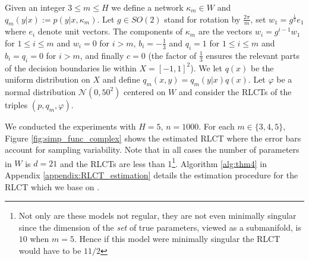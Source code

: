 \documentclass{article} %
\begin{document}
%


Given an integer $3 \le m \le H$ we define a network $\kappa_m \in W$ and $q_m(y|x) := p(y|x, \kappa_m)$. Let $g \in SO(2)$ stand for rotation by $\frac{2\pi}{m}$, set $w_1 = g^{\tfrac{1}{2}} e_1$ where $e_i$ denote unit vectors. The components of $\kappa_m$ are the vectors $w_i = g^{i-1} w_1$ for $1 \le i \le m$ and $w_i = 0$ for $i > m$, $b_i = - \tfrac{1}{3}$ and $q_i = 1$ for $1 \le i \le m$ and $b_i = q_i = 0$ for $i > m$, and finally $c = 0$ (the factor of $\tfrac{1}{3}$ ensures the relevant parts of the decision boundaries lie within $X = [-1,1]^2$). We let $q(x)$ be the uniform distribution on $X$ and define $q_m(x,y) = q_m(y|x) q(x)$. Let $\varphi$ be a normal distribution $\mathcal{N}(0,50^2)$ centered on $W$ and consider the RLCTs of the triples $(p, q_m, \varphi)$. 

We conducted the experiments with $H = 5$, $n = 1000$. For each $m \in \{3,4,5\}$, Figure \ref{fig:simp_func_complex} shows the estimated RLCT where the error bars account for sampling variability. Note that in all cases the number of parameters in $W$ is $d = 21$ and the RLCTs are less than 1\footnote{Not only are these models not regular, they are not even minimally singular since the dimension of the \emph{set} of true parameters, viewed as a submanifold, is $10$ when $m = 5$. Hence if this model were minimally singular the RLCT would have to be $11/2$}. Algorithm \ref{alg:thm4} in Appendix \ref{appendix:RLCT_estimation} details the estimation procedure for the RLCT which we base on \citep[Theorem 4]{watanabe_widely_2013}. 
\end{document}
